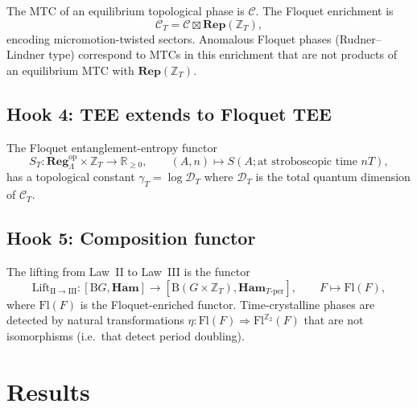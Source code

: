 \documentclass[12pt]{article}
\theoremstyle{plain}
\theoremstyle{definition}
\theoremstyle{remark}
\newcommand{\Ham}{\mathbf{Ham}}
\newcommand{\Rep}{\mathbf{Rep}}
\newcommand{\BG}{\mathrm{B}G}
\begin{document}
The MTC of an equilibrium topological phase is $\mathcal{C}$. The Floquet enrichment is
\[
\mathcal{C}_{T} = \mathcal{C}\boxtimes\Rep(\mathbb{Z}_{T}),
\]
encoding micromotion-twisted sectors. Anomalous Floquet phases (Rudner--Lindner type)
correspond to MTCs in this enrichment that are not products of an equilibrium MTC with
$\Rep(\mathbb{Z}_{T})$.

\subsection{Hook 4: TEE extends to Floquet TEE}

The Floquet entanglement-entropy functor
\[
S_{T}: \mathbf{Reg}_{\Lambda}^{\mathrm{op}}\times\mathbb{Z}_{T}\to\mathbb{R}_{\geq 0},
\qquad (A,n)\mapsto S(A;\text{at stroboscopic time }nT),
\]
has a topological constant $\gamma_{T}=\log\mathcal{D}_{T}$ where $\mathcal{D}_{T}$ is
the total quantum dimension of $\mathcal{C}_{T}$.

\subsection{Hook 5: Composition functor}

The lifting from Law~II to Law~III is the functor
\[
\mathrm{Lift}_{\mathrm{II}\to\mathrm{III}}:
[\BG,\Ham] \to [\mathrm{B}(G\times\mathbb{Z}_{T}),\Ham_{T\text{-per}}],
\qquad F\mapsto \mathrm{Fl}(F),
\]
where $\mathrm{Fl}(F)$ is the Floquet-enriched functor. Time-crystalline phases are
detected by natural transformations $\eta:\mathrm{Fl}(F)\Rightarrow\mathrm{Fl}^{\mathbb{Z}_{2}}(F)$
that are not isomorphisms (i.e.\ that detect period doubling).

\section{Results}
\label{sec:results}
\end{document}
